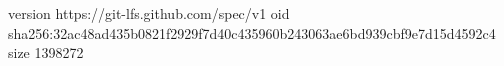 version https://git-lfs.github.com/spec/v1
oid sha256:32ac48ad435b0821f2929f7d40c435960b243063ae6bd939cbf9e7d15d4592c4
size 1398272
